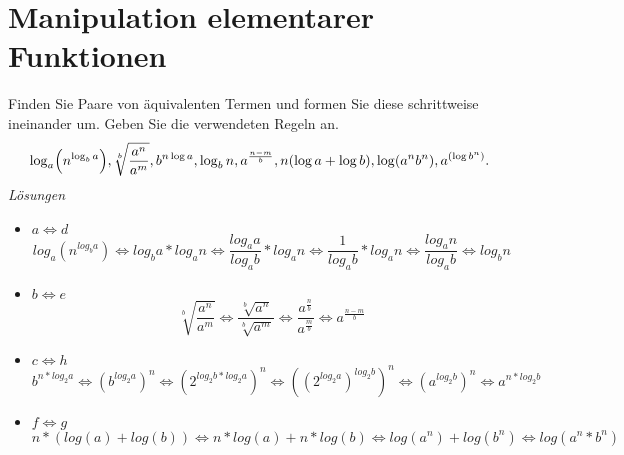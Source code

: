 
\newpage



\newpage
\section{Manipulation elementarer Funktionen}

Finden Sie Paare von \"aquivalenten Termen und formen Sie diese
schrittweise ineinander um. Geben Sie die verwendeten Regeln an.
\[
 \log_a\Bigl(n^{\log_b a}\Bigr), \sqrt[b]{\frac{a^n}{a^m}},
 b^{n \log a}, \log_b n, a^{\frac{n-m}{b}}, n(\log a + \log b),
 \log(a^nb^n),a^{(\log b^n)}.
\]
{\itshape Lösungen}
\begin{itemize}
\item $a \Leftrightarrow d$ \\
	  \[
      log_{a}(n^{log_{b}a}) \Leftrightarrow log_{b}a * log_{a}n \Leftrightarrow \frac{log_{a}a}{log_{a}b} * log_{a}n \Leftrightarrow \frac{1}{log_{a}b} * log_{a}n \Leftrightarrow \frac{log_{a}n}{log_{a}b} \Leftrightarrow log_{b}n
      \]
\item $b \Leftrightarrow e$ \\
	  \[
       \sqrt[b]{\frac{a^n}{a^m}} \Leftrightarrow \frac{\sqrt[b]{a^n}}{\sqrt[b]{a^m}} \Leftrightarrow \frac{a^{\frac{n}{b}}}{a^{\frac{m}{b}}} \Leftrightarrow a^{\frac{n-m}{b}}
      \]
\item $c \Leftrightarrow h$ \\
	  \[
        b^{n*log_{2}a} \Leftrightarrow (b^{log_{2}a})^n \Leftrightarrow (2^{log_{2}b * log_{2}a})^n \Leftrightarrow ((2^{log_{2}a})^{log_{2}b})^n \Leftrightarrow (a^{log_{2}b})^n \Leftrightarrow a^{n * log_{2}b}
      \]
\item $ f \Leftrightarrow g$
      \[
       n*(log(a) + log(b)) \Leftrightarrow n * log(a) + n* log(b) \Leftrightarrow log(a^n) + log(b^n) \Leftrightarrow log(a^n*b^n)
      \]
\end{itemize}




